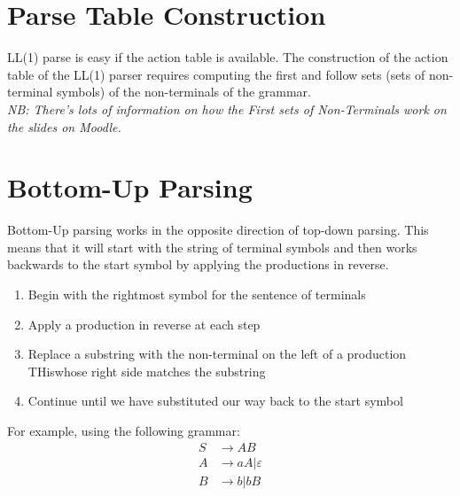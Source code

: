 
\section{Parse Table Construction}
LL(1) parse is easy if the action table is available. The construction of the action table of the LL(1) parser requires computing the first and follow sets (sets of non-terminal symbols) of the non-terminals of the grammar. \\

\textit{NB: There's lots of information on how the First sets of Non-Terminals work on the slides on Moodle.}

\section{Bottom-Up Parsing}
Bottom-Up parsing works in the opposite direction of top-down parsing. This means that it will start with the string of terminal symbols and then works backwards to the start symbol by applying the productions in reverse. 

\begin{enumerate}
    \item Begin with the rightmost symbol for the sentence of terminals
    \item Apply a production in reverse at each step
    \item Replace a substring with the non-terminal on the left of a production THiswhose right side matches the substring
    \item Continue until we have substituted our way back to the start symbol
\end{enumerate}

For example, using the following grammar:
\begin{align*}
    S & \rightarrow AB \\
    A & \rightarrow aA | \varepsilon \\
    B & \rightarrow b | bB
\end{align*}

